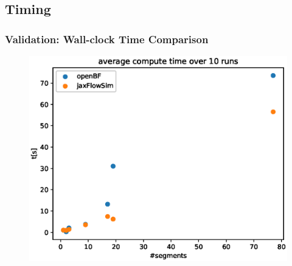 \documentclass[compress]{beamer}
\begin{document}
\subsection{Timing}
\begin{frame}
	\frametitle{Validation: Wall-clock Time Comparison}
	\begin{figure} [H]
		\centering
		\includegraphics[width=0.94\columnwidth]{../figures/timing_benchmark.eps}
		\label{fig:comparison}
	\end{figure}

\end{frame}
\end{document}

